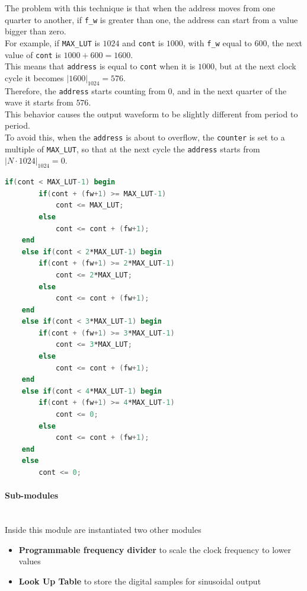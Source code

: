 \newpage
\noindent
The problem with this technique is that when the address moves from one quarter to another, if \texttt{f\_w} is greater than one, the address can start from a value bigger than zero. \\
For example, if \texttt{MAX\_LUT} is \(1024\) and \texttt{cont} is \(1000\), with \texttt{f\_w} equal to \(600\), the next value of \texttt{cont} is \(1000 + 600 = 1600\).\\
This means that \texttt{address} is equal to \texttt{cont} when it is \(1000\), but at the next clock cycle it becomes \(|1600|_{1024} = 576\).\\
Therefore, the \texttt{address} starts counting from \(0\), and in the next quarter of the wave it starts from \(576\).\\
This behavior causes the output waveform to be slightly different from period to period.\\
To avoid this, when the \texttt{address} is about to overflow, the \texttt{counter} is set to a multiple of \texttt{MAX\_LUT}, so that at the next cycle the \texttt{address} starts from \(|N \cdot 1024|_{1024} = 0\).

\vspace{1cm}
\begin{lstlisting}[language=Verilog, caption=Calculation of counter for DDFS address, 
label=lst:DDFS_cont_calculation ]
    if(cont < MAX_LUT-1) begin
        if(cont + (fw+1) >= MAX_LUT-1)
            cont <= MAX_LUT;
        else
            cont <= cont + (fw+1);
    end
    else if(cont < 2*MAX_LUT-1) begin
        if(cont + (fw+1) >= 2*MAX_LUT-1)
            cont <= 2*MAX_LUT;
        else
            cont <= cont + (fw+1);
    end
    else if(cont < 3*MAX_LUT-1) begin
        if(cont + (fw+1) >= 3*MAX_LUT-1)
            cont <= 3*MAX_LUT;
        else
            cont <= cont + (fw+1);
    end
    else if(cont < 4*MAX_LUT-1) begin
        if(cont + (fw+1) >= 4*MAX_LUT-1)
            cont <= 0;
        else
            cont <= cont + (fw+1);
    end
    else
        cont <= 0;
\end{lstlisting}
\vspace{1cm}

\paragraph{Sub-modules} \quad \\
Inside this module are instantiated two other modules

\begin{itemize}
    \item \textbf{Programmable frequency divider} to scale the clock frequency to lower values
    \item \textbf{Look Up Table} to store the digital samples for sinusoidal output
\end{itemize}

